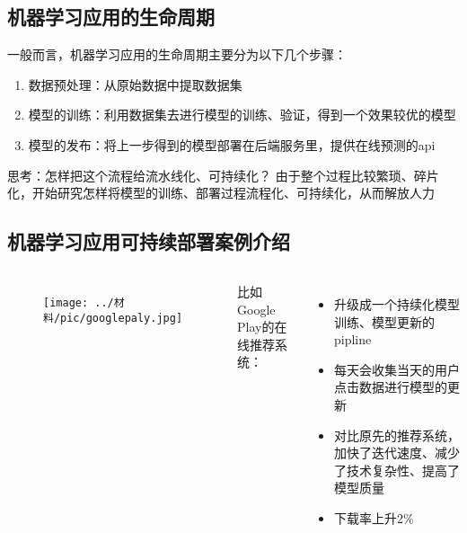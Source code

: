 \documentclass[notheorems, aspectratio=1610]{beamer}
\begin{document}
\subsection{机器学习应用的生命周期}
\begin{frame}
    一般而言，机器学习应用的生命周期主要分为以下几个步骤：
    \begin{enumerate}
        \item 数据预处理：从原始数据中提取数据集
        \item 模型的训练：利用数据集去进行模型的训练、验证，得到一个效果较优的模型
        \item 模型的发布：将上一步得到的模型部署在后端服务里，提供在线预测的api
    \end{enumerate}
    \begin{block}{思考：怎样把这个流程给流水线化、可持续化？}
        由于整个过程比较繁琐、碎片化，开始研究怎样将模型的训练、部署过程流程化、可持续化，从而解放人力
    \end{block}
\end{frame}
\subsection{机器学习应用可持续部署案例介绍}
\begin{frame}
\begin{columns}
    
    \begin{figure}[h] %
        \flushleft %
        \texttt{[image: ../材料/pic/googlepaly.jpg]} %
    \end{figure}%
    比如Google Play的在线推荐系统：
    \begin{itemize}

        \item 升级成一个持续化模型训练、模型更新的pipline
        \item 每天会收集当天的用户点击数据进行模型的更新
        \item 对比原先的推荐系统，加快了迭代速度、减少了技术复杂性、提高了模型质量
        \item 下载率上升2\%
    \end{itemize}
\end{columns}

\end{frame}
\end{document}
